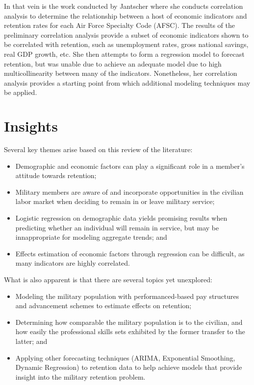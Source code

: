 \documentclass[12pt,letterpaper,toc=flat,oneside]{report}
\providecommand{\tightlist}{%
\setlength{\itemsep}{0pt}\setlength{\parskip}{0pt}}
\theoremstyle{definition}
\theoremstyle{definition}
\theoremstyle{definition}
\theoremstyle{remark}
\begin{document}
In that vein is the work conducted by Jantscher \cite{jantscher-2016}
where she conducts correlation analysis to determine the relationship
between a host of economic indicators and retention rates for each Air
Force Specialty Code (AFSC). The results of the preliminary correlation
analysis provide a subset of economic indicators shown to be correlated
with retention, such as unemployment rates, gross national savings, real
GDP growth, etc. She then attempts to form a regression model to
forecast retention, but was unable due to achieve an adequate model due
to high multicollinearity between many of the indicators. Nonetheless,
her correlation analysis provides a starting point from which additional
modeling techniques may be applied.

\hypertarget{insights}{%
\section{Insights}\label{insights}}

Several key themes arise based on this review of the literature:

\begin{itemize}
\tightlist
\item
  Demographic and economic factors can play a significant role in a
  member's attitude towards retention;
\item
  Military members are aware of and incorporate opportunities in the
  civilian labor market when deciding to remain in or leave military
  service;
\item
  Logistic regression on demographic data yields promising results when
  predicting whether an individual will remain in service, but may be
  innappropriate for modeling aggregate trends; and
\item
  Effects estimation of economic factors through regression can be
  difficult, as many indicators are highly correlated.
\end{itemize}

What is also apparent is that there are several topics yet unexplored:

\begin{itemize}
\tightlist
\item
  Modeling the military population with performanced-based pay
  structures and advancement schemes to estimate effects on retention;
\item
  Determining how comparable the military population is to the civilian,
  and how easily the professional skills sets exhibited by the former
  transfer to the latter; and
\item
  Applying other forecasting techniques (ARIMA, Exponential Smoothing,
  Dynamic Regression) to retention data to help achieve models that
  provide insight into the military retention problem.
\end{itemize}
\end{document}
